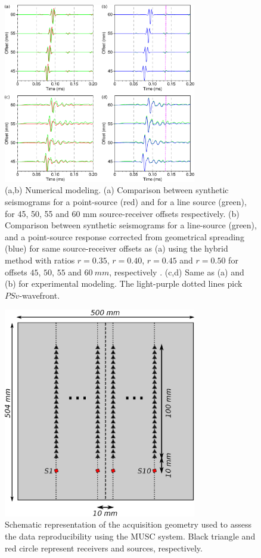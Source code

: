 \documentclass[manuscript,revised]{geophysics}
\begin{document}
\begin{figure}[!h]
	\centering
	\includegraphics[width=0.75\textwidth]{fig/trans2d3d.eps}
	\caption{(a,b) Numerical modeling. (a) Comparison between synthetic seismograms for a point-source (red) and for a line source (green), for 45, 50, 55 and 60 mm source-receiver offsets respectively. (b) Comparison between synthetic seismograms for a line-source (green), and a point-source response corrected from geometrical spreading (blue) for same source-receiver offsets as (a) using the hybrid method with ratios $r=0.35$, $r=0.40$, $r=0.45$ and $r=0.50$ for offsets $45$, $50$, $55$ and $60\ mm$, respectively . (c,d) Same as (a) and (b) for experimental modeling. The light-purple dotted lines pick $PSv$-wavefront.}%
	\label{panel_amplitude_sem}
\end{figure}

\begin{figure}[!h]
	\centering
	\includegraphics[width=0.75\textwidth]{fig/reproducibility_acqui_principle.eps}
	\caption{Schematic representation of the acquisition geometry used to assess the data reproducibility using the MUSC system. Black triangle and red circle represent receivers and sources, respectively.}
	\label{reproducibility_acqui_principle}
\end{figure}
\end{document}
